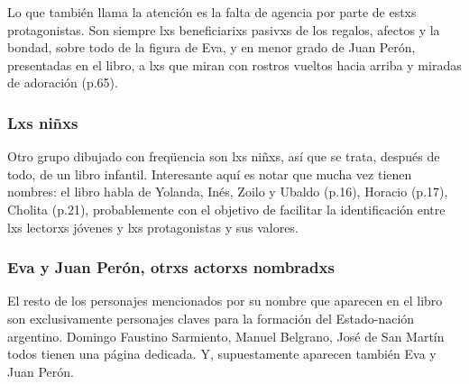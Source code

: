 Lo que también llama la atención es la falta de agencia por parte de estxs protagonistas.
Son siempre lxs beneficiarixs pasivxs de los regalos, afectos y la bondad, sobre todo de la figura de Eva, y en menor grado de Juan Perón, presentadas en el libro, a lxs que miran con rostros vueltos hacia arriba y miradas de adoración (p.65).

\subsubsection{Lxs niñxs}
Otro grupo dibujado con freqüencia son lxs niñxs, así que se trata, después de todo, de un libro infantil.
Interesante aquí es notar que mucha vez tienen nombres: el libro habla de Yolanda, Inés, Zoilo y Ubaldo (p.16), Horacio (p.17), Cholita (p.21),
probablemente con el objetivo de facilitar la identificación entre lxs lectorxs jóvenes y lxs protagonistas y sus valores.


\subsubsection{Eva y Juan Perón, otrxs actorxs nombradxs}
El resto de los personajes mencionados por su nombre que aparecen en el libro son exclusivamente personajes claves para la formación del Estado-nación argentino.
Domingo Faustino Sarmiento, Manuel Belgrano, José de San Martín todos tienen una página dedicada.
Y, supuestamente aparecen también Eva y Juan Perón.

